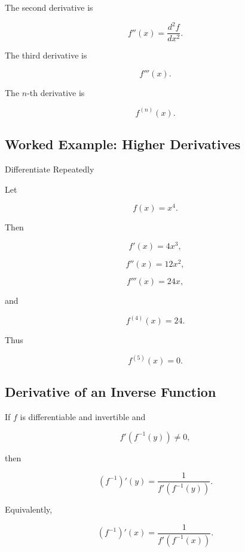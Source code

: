 The second derivative is

\[
\boxed{
f''(x)
=
\frac{d^2f}{dx^2}.
}
\]

The third derivative is

\[
\boxed{
f'''(x).
}
\]

The \(n\)-th derivative is

\[
\boxed{
f^{(n)}(x).
}
\]

\subsection{Worked Example: Higher Derivatives}
\label{subsec:worked-higher-derivatives}

\begin{workedexamplebox}{Differentiate Repeatedly}

Let

\[
f(x)=x^4.
\]

Then

\[
f'(x)=4x^3,
\]

\[
f''(x)=12x^2,
\]

\[
f'''(x)=24x,
\]

and

\[
f^{(4)}(x)=24.
\]

Thus

\begin{answerbox}
\[
\boxed{
f^{(5)}(x)=0.
}
\]
\end{answerbox}

\end{workedexamplebox}

\subsection{Derivative of an Inverse Function}
\label{subsec:inverse-function-derivative-general}

If \(f\) is differentiable and invertible and

\[
f'(f^{-1}(y))\neq0,
\]

then

\[
\boxed{
(f^{-1})'(y)
=
\frac{
1
}{
f'(f^{-1}(y))
}.
}
\]

Equivalently,

\[
\boxed{
(f^{-1})'(x)
=
\frac{
1
}{
f'(f^{-1}(x))
}.
}
\]

